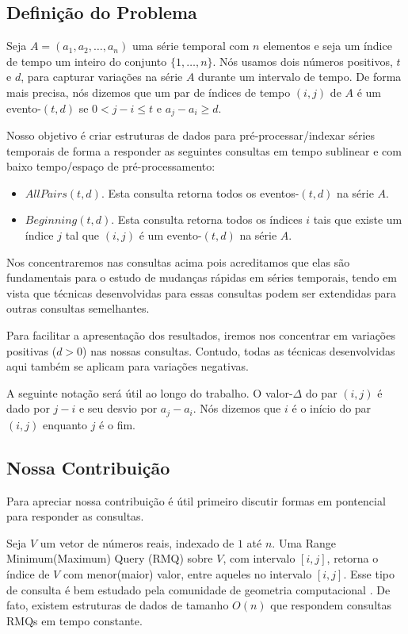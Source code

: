 \documentclass[dissertacao, brazil]{ThesisPUC}
\begin{document}
\subsection{Definição do Problema}

Seja $A = (a_1, a_2, \ldots, a_n)$ uma série temporal com $n$ elementos
e seja um índice de tempo um inteiro do conjunto $\{1, \ldots, n\}$. Nós
usamos dois números positivos, $t$ e $d$, para capturar variações na série
$A$ durante um intervalo de tempo. De forma mais precisa, nós dizemos que um
par de índices de tempo $(i,j)$ de $A$ é um evento-$(t,d)$ se $0<j - i \le t$ e $a_j - a_i \ge d$.

Nosso objetivo é criar estruturas de dados para pré-processar/indexar séries temporais
de forma a responder as seguintes consultas em tempo sublinear e com baixo tempo/espaço
de pré-processamento:

\begin{itemize}
\item $AllPairs(t, d)$. Esta consulta retorna todos os eventos-$(t,d)$ na série $A$.
\item $Beginning(t, d)$. Esta consulta retorna todos os índices $i$ tais que existe um
índice $j$ tal que $(i,j)$ é um evento-$(t, d)$ na série $A$.
\end{itemize}

Nos concentraremos nas consultas acima pois acreditamos que elas são fundamentais
para o estudo de mudanças rápidas em séries temporais, tendo em vista que 
técnicas desenvolvidas para essas consultas podem ser extendidas para outras
consultas semelhantes.

Para facilitar a apresentação dos resultados, iremos nos concentrar
em variações positivas ($d > 0$) nas nossas consultas. Contudo, todas as técnicas
desenvolvidas aqui também se aplicam para variações negativas.

A seguinte notação será útil ao longo do trabalho. O valor-$\Delta$ do par $(i, j)$
é dado por $j - i$ e seu desvio por $a_j - a_i$. Nós dizemos que $i$ é o início
do par $(i, j)$ enquanto $j$ é o fim.

\subsection{Nossa Contribuição}

Para apreciar nossa contribuição é útil primeiro discutir formas
em pontencial para responder as consultas.

Seja $V$ um vetor de números reais, indexado de $1$ até $n$. Uma Range
Minimum(Maximum) Query (RMQ) sobre $V$, com intervalo $[i,j]$, retorna
o índice de $V$ com menor(maior) valor, entre aqueles no intervalo $[i,j]$.
Esse tipo de consulta é bem estudado pela comunidade de geometria computacional
\cite{lala}. De fato, existem estruturas de dados de tamanho $O(n)$ que respondem
consultas RMQs em tempo constante.
\end{document}
